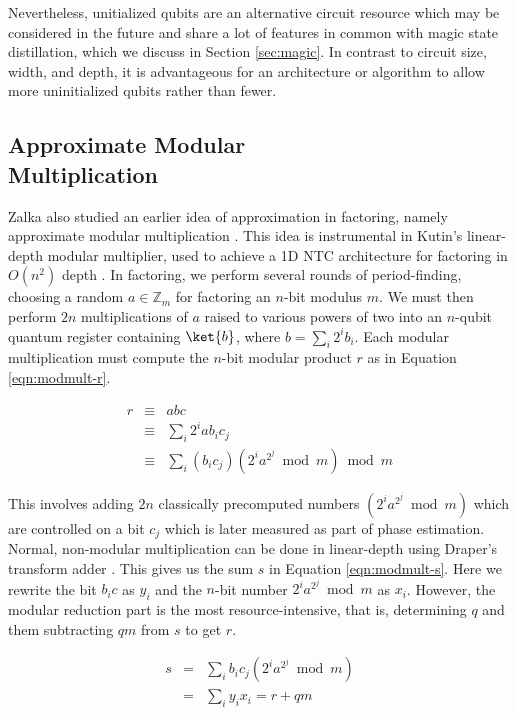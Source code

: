 Nevertheless, unitialized qubits are an alternative circuit resource which
may be considered in the future and share a lot of features in common with
magic state distillation, which we discuss in Section \ref{sec:magic}. In
contrast to circuit size, width, and depth, it is advantageous for
an architecture or algorithm
to allow more uninitialized qubits rather than fewer.

\subsection{Approximate Modular\\ Multiplication}

Zalka also studied an earlier idea of approximation in factoring, namely
approximate modular multiplication \cite{Zalka1998}.
This idea is instrumental in Kutin's linear-depth modular multiplier,
used to achieve a 1D NTC architecture for factoring in $O(n^2)$ depth
\cite{Kutin2006}. In factoring, we perform several rounds of period-finding,
choosing a random $a \in \mathbb{Z}_m$ for factoring an $n$-bit modulus $m$.
We must then
perform $2n$ multiplications of $a$ raised to various powers of two
into an $n$-qubit quantum register containing $\ket{b}$, where
$b = \sum_{i} 2^ib_i$. Each
modular multiplication must compute the $n$-bit modular product
$r$ as in Equation \ref{eqn:modmult-r}.

\begin{eqnarray}
r & \equiv & abc \\
  & \equiv & \sum_{i} 2^i a b_i c_j \\
  & \equiv & \sum_{i} (b_i c_j)(2^i a^{2^j} \bmod m) \bmod m
\label{eqn:modmult-r}
\end{eqnarray}

This involves adding $2n$ classically precomputed numbers
$(2^i a^{2^j} \bmod m)$ which are controlled on a bit $c_j$
which is later measured as
part of phase estimation. Normal, non-modular multiplication can be done
in linear-depth using Draper's transform adder \cite{Draper2000}. This gives
us the sum $s$ in Equation \ref{eqn:modmult-s}. Here we rewrite the
bit $b_i c$ as $y_i$ and the $n$-bit number $2^i a^{2^j} \bmod m$ as
$x_i$. However,
the modular reduction part is the most resource-intensive, that is,
determining $q$ and them subtracting $qm$ from $s$ to get $r$.

\begin{eqnarray}
s & = & \sum_i b_i c_j (2^i a^{2^j} \bmod m) \\
  & = & \sum_i y_i x_i = r + qm
\label{eqn:modmult-s}
\end{eqnarray}

